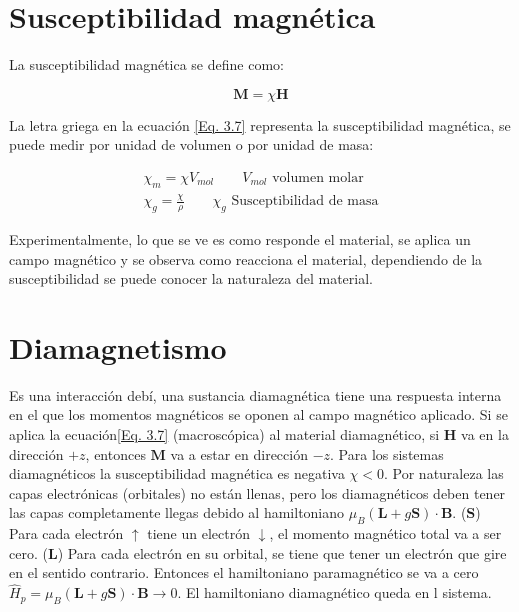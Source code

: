 \documentclass[11pt,fleqn]{book}
\renewcommand{\vec}[1]{\mathbf{#1}}
\begin{document}
\section{Susceptibilidad magnética}

La susceptibilidad magnética se define como:

\begin{equation}
    \vec{M}=\chi\vec{H}
    \label{Eq. 3.7}
\end{equation}

La letra griega en la ecuación \ref{Eq. 3.7} representa la susceptibilidad magnética, se puede medir por unidad de volumen o por unidad de masa:

\begin{equation}
    \begin{split}
        \chi_{m}=\chi V_{mol}\qquad V_{mol}\text{ volumen molar}\\
        \chi_{g}=\frac{\chi}{\rho}\qquad\chi_{g}\text{ Susceptibilidad de masa}
    \end{split}
    \label{Eq. 3.8}
\end{equation}
        
Experimentalmente, lo que se ve es como responde el material, se aplica un campo magnético y se observa como reacciona el material, dependiendo de la susceptibilidad se puede conocer la naturaleza del material.

\section{Diamagnetismo}
        
Es una interacción debí, una sustancia diamagnética tiene una respuesta interna en el que los momentos magnéticos se oponen al campo magnético aplicado. Si se aplica la ecuación\ref{Eq. 3.7} (macroscópica) al material diamagnético, si $\vec{H}$ va en la dirección $+z$, entonces $\vec{M}$ va a estar en dirección $-z$. Para los sistemas diamagnéticos la susceptibilidad magnética es negativa $\chi<0$. Por naturaleza las capas electrónicas (orbitales) no están llenas, pero los diamagnéticos deben tener las capas completamente llegas debido al hamiltoniano $\mu_{B}(\vec{L}+g\vec{S})\cdot\vec{B}$. ($\vec{S}$) Para cada electrón  $\uparrow$ tiene un electrón $\downarrow$, el momento magnético total va a ser cero. ($\vec{L}$) Para cada electrón en su orbital, se tiene que tener un electrón que gire en el sentido contrario. Entonces el hamiltoniano paramagnético se va a cero $\hat{H}_{p}=\mu_{B}(\vec{L}+g\vec{S})\cdot\vec{B}\longrightarrow0$. El hamiltoniano diamagnético queda en l sistema.
        
\end{document}
